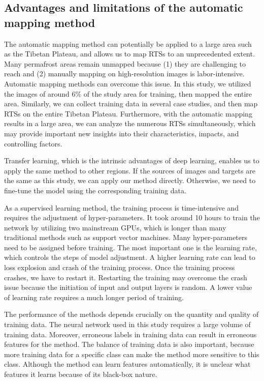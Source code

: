 \documentclass[authoryear,preprint,review,12pt]{elsarticle}
\begin{document}
\subsection{Advantages and limitations of the automatic mapping method}
\label{subsec_advantage_limitation_method}

The automatic mapping method can potentially be applied to a large area such as the Tibetan Plateau, and allows us to map RTSs to an unprecedented extent. Many permafrost areas remain unmapped because (1) they are challenging to reach and (2) manually mapping on high-resolution images is labor-intensive. Automatic mapping methods can overcome this issue. In this study, we utilized the images of around 6\% of the study area for training, then mapped the entire area. Similarly, we can collect training data in several case studies, and then map RTSs on the entire Tibetan Plateau. Furthermore, with the automatic mapping results in a large area, we can analyze the numerous RTSs simultaneously, which may provide important new insights into their characteristics, impacts, and controlling factors.  

Transfer learning, which is the intrinsic advantages of deep learning, enables us to apply the same method to other regions. If the sources of images and targets are the same as this study, we can apply our method directly. Otherwise, we need to fine-tune the model using the corresponding training data. 

As a supervised learning method, the training process is time-intensive and requires the adjustment of hyper-parameters. It took around 10 hours to train the network by utilizing two mainstream GPUs, which is longer than many traditional methods such as support vector machines. Many hyper-parameters need to be assigned before training. The most important one is the learning rate, which controls the steps of model adjustment. A higher learning rate can lead to loss explosion and crash of the training process. Once the training process crashes, we have to restart it. Restarting the training may overcome the crash issue because the initiation of input and output layers is random. A lower value of learning rate requires a much longer period of training. 

The performance of the methods depends crucially on the quantity and quality of training data. The neural network used in this study requires a large volume of training data. Moreover, erroneous labels in training data can result in erroneous  features for the method. The balance of training data is also important, because more training data for a specific class can make the method more sensitive to this class. Although the method can learn features automatically, it is unclear what features it learns because of its black-box nature. 
\end{document}
